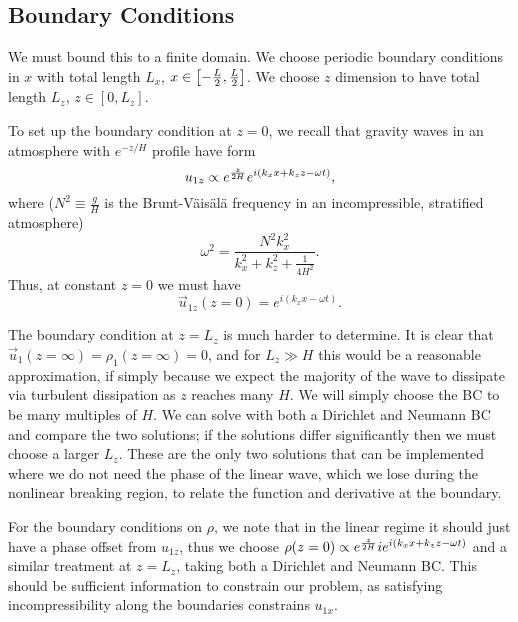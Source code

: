 \documentclass[11pt,
        usenames, %
        dvipsnames %
    ]{report}
\DeclarePairedDelimiter\p{\lparen}{\rparen}
\DeclarePairedDelimiter\s{\lbrack}{\rbrack}
\begin{document}

\subsection{Boundary Conditions}

We must bound this to a finite domain. We choose periodic boundary conditions in
$x$ with total length $L_x$, $x \in \s*{-\frac{L}{2}, \frac{L}{2}}$. We choose
$z$ dimension to have total length $L_z$, $z \in [0, L_z]$.

To set up the boundary condition at $z = 0$, we recall that gravity waves in an
atmosphere with $e^{-z/H}$ profile have form
\begin{equation}
    u_{1z} \propto e^{\frac{z}{2H}}e^{i\p*{k_xx + k_zz - \omega t}},
        \label{eq:bc_below}
\end{equation}
where ($N^2 \equiv \frac{g}{H}$ is the Brunt-V\"ais\"al\"a frequency in an
incompressible, stratified atmosphere)
\begin{equation}
    \omega^2 = \frac{N^2 k_x^2}{k_x^2 + k_z^2 + \frac{1}{4H^2}}.
        \label{eq:omega}
\end{equation}
Thus, at constant $z = 0$ we must have
\begin{equation}
    \vec{u}_{1z}(z = 0) = e^{i(k_xx - \omega t)}\label{eq:bc_u1z}.
\end{equation}

The boundary condition at $z = L_z$ is much harder to determine. It is clear
that $\vec{u}_1(z = \infty) = \rho_1(z = \infty) = 0$, and for $L_z \gg H$ this
would be a reasonable approximation, if simply because we expect the majority of
the wave to dissipate via turbulent dissipation as $z$ reaches many $H$. We will
simply choose the BC to be many multiples of $H$. We can solve with both a
Dirichlet and Neumann BC and compare the two solutions; if the solutions
differ significantly then we must choose a larger $L_z$. These are the only two
solutions that can be implemented where we do not need the phase of the linear
wave, which we lose during the nonlinear breaking region, to relate the function
and derivative at the boundary.

For the boundary conditions on $\rho$, we note that in the linear regime it
should just have a phase offset from $u_{1z}$, thus we choose $\rho(z = 0)
\propto e^{\frac{z}{2H}}ie^{i\p*{k_xx + k_zz - \omega t}}$ and a similar
treatment at $z = L_z$, taking both a Dirichlet and Neumann BC\@. This should be
sufficient information to constrain our problem, as satisfying incompressibility
along the boundaries constrains $u_{1x}$.
\end{document}
